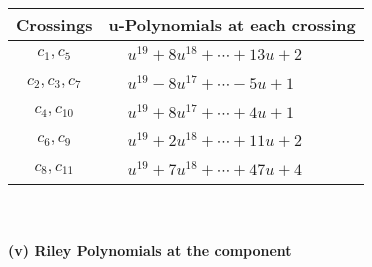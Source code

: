 \documentclass[1p]{elsarticle_modified}
\theoremstyle{definition}
\begin{document}
\begin{tabular}{m{50pt}|m{274pt}}
Crossings & \hspace{64pt}u-Polynomials at each crossing \\
\hline $$\begin{aligned}c_{1},c_{5}\end{aligned}$$&$\begin{aligned}
&u^{19}+8 u^{18}+\cdots+13 u+2
\end{aligned}$\\
\hline $$\begin{aligned}c_{2},c_{3},c_{7}\end{aligned}$$&$\begin{aligned}
&u^{19}-8 u^{17}+\cdots-5 u+1
\end{aligned}$\\
\hline $$\begin{aligned}c_{4},c_{10}\end{aligned}$$&$\begin{aligned}
&u^{19}+8 u^{17}+\cdots+4 u+1
\end{aligned}$\\
\hline $$\begin{aligned}c_{6},c_{9}\end{aligned}$$&$\begin{aligned}
&u^{19}+2 u^{18}+\cdots+11 u+2
\end{aligned}$\\
\hline $$\begin{aligned}c_{8},c_{11}\end{aligned}$$&$\begin{aligned}
&u^{19}+7 u^{18}+\cdots+47 u+4
\end{aligned}$\\
\hline
\end{tabular}\\~\\
\newpage\renewcommand{\arraystretch}{1}
\flushleft \textbf{(v) Riley Polynomials at the component}\newline \\
\end{document}
